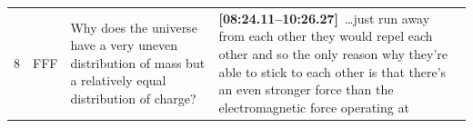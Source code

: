 \documentclass[10pt]{article}
\begin{document}
\begin{tiny}
\begin{longtable}{r p{0.3in} p{1.212in} p{3.8in}}
    8  &          FFF &                                                                                                                                                                     Why does the universe have a very uneven distribution of mass but a relatively equal distribution of charge? &                                                                                                                                                                                                                                                                                                                                                                                                                                                                                                                                                                                                                                                                                                                                                                                                                                                                                                                                                                                                                                                                                                                                                                                                                                                                                                                                                                                                                                                                                                                                                                                                                                                                                                                                                                                                                                                                                                                                                                                                                                                                                                                                                                                                                                                                                                                                                                                                                                                                                                                                                                                                                                                                                                                                                                                                                                             \textbf{[08:24.11--10:26.27]}~\ldots just run away from each other they would repel each other and so the only reason why they're able to stick to each other is that there's an even stronger force than the electromagnetic force operating at 
\end{longtable}
\end{tiny}
\end{document}
